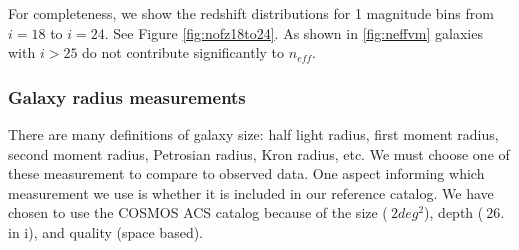\documentclass[]{article}
\begin{document}
For completeness, we show the redshift distributions for 1 magnitude bins from $i=18$ to $i=24$.  See Figure \ref{fig:nofz18to24}.  As shown in \ref{fig:neffvm}
galaxies with $i > 25$ do not contribute significantly to $n_{eff}$. 

\subsubsection{Galaxy radius measurements}
There are many definitions of galaxy size: half light radius, first moment radius, second moment radius, Petrosian radius, Kron radius, etc.
We must choose one of these measurement to compare to observed data.  One aspect informing which measurement we use is whether it is included 
in our reference catalog.  We have chosen to use the COSMOS ACS catalog \cite{cosmos} because of the size ($~2deg^2$), depth ($~26.$ in i), and
quality (space based).  
\end{document}
